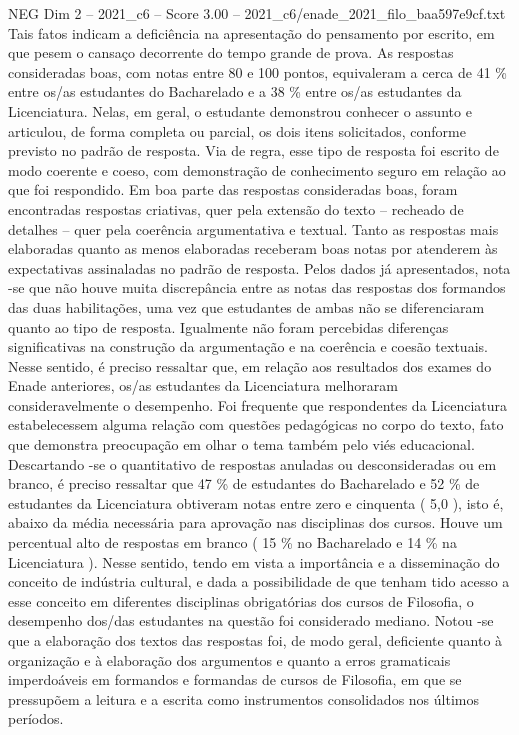 \begin{textsample}{NEG Dim 2 – 2021\_c6 – Score 3.00 – 2021\_c6/enade\_2021\_filo\_baa597e9cf.txt}
Tais fatos indicam a deficiência na apresentação do pensamento por escrito, em que pesem o cansaço decorrente do tempo grande de prova.
As respostas consideradas boas, com notas entre 80 e 100 pontos, equivaleram a cerca de 41 \% entre os/as estudantes do Bacharelado e a 38 \% entre os/as estudantes da Licenciatura.
Nelas, em geral, o estudante demonstrou conhecer o assunto e articulou, de forma completa ou parcial, os dois itens solicitados, conforme previsto no padrão de resposta.
Via de regra, esse tipo de resposta foi escrito de modo coerente e coeso, com demonstração de conhecimento seguro em relação ao que foi respondido.
Em boa parte das respostas consideradas boas, foram encontradas respostas criativas, quer pela extensão do texto – recheado de detalhes – quer pela coerência argumentativa e textual.
Tanto as respostas mais elaboradas quanto as menos elaboradas receberam boas notas por atenderem às expectativas assinaladas no padrão de resposta.
Pelos dados já apresentados, nota -se que não houve muita discrepância entre as notas das respostas dos formandos das duas habilitações, uma vez que estudantes de ambas não se diferenciaram quanto ao tipo de resposta.
Igualmente não foram percebidas diferenças significativas na construção da argumentação e na coerência e coesão textuais.
Nesse sentido, é preciso ressaltar que, em relação aos resultados dos exames do Enade anteriores, os/as estudantes da Licenciatura melhoraram consideravelmente o desempenho.
Foi frequente que respondentes da Licenciatura estabelecessem alguma relação com questões pedagógicas no corpo do texto, fato que demonstra preocupação em olhar o tema também pelo viés educacional.
Descartando -se o quantitativo de respostas anuladas ou desconsideradas ou em branco, é preciso ressaltar que 47 \% de estudantes do Bacharelado e 52 \% de estudantes da Licenciatura obtiveram notas entre zero e cinquenta ( 5,0 ), isto é, abaixo da média necessária para aprovação nas disciplinas dos cursos.
Houve um percentual alto de respostas em branco ( 15 \% no Bacharelado e 14 \% na Licenciatura ).
Nesse sentido, tendo em vista a importância e a disseminação do conceito de indústria cultural, e dada a possibilidade de que tenham tido acesso a esse conceito em diferentes disciplinas obrigatórias dos cursos de Filosofia, o desempenho dos/das estudantes na questão foi considerado mediano.
Notou -se que a elaboração dos textos das respostas foi, de modo geral, deficiente quanto à organização e à elaboração dos argumentos e quanto a erros gramaticais imperdoáveis em formandos e formandas de cursos de Filosofia, em que se pressupõem a leitura e a escrita como instrumentos consolidados nos últimos períodos.

\end{textsample}
